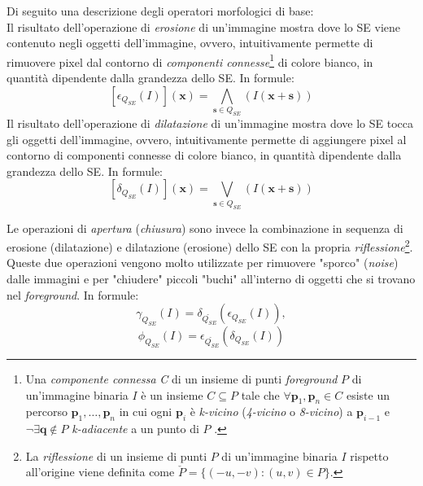 \par Di seguito una descrizione degli operatori morfologici di base:\\
Il risultato dell'operazione di \textit{erosione} di un'immagine mostra dove lo SE viene contenuto negli oggetti dell'immagine, ovvero, intuitivamente permette di rimuovere pixel dal contorno di \textit{componenti connesse}\footnote{Una \textit{componente connessa} \textit{C} di un insieme di punti \textit{foreground} $P$ di un'immagine binaria $I$ \`e un insieme $C\subseteq P$ tale che $\forall \textbf{p}_{1}, \textbf{p}_{n} \in C$ esiste un percorso $\textbf{p}_{1}, \dots, \textbf{p}_{n}$ in cui ogni $\textbf{p}_{i}$ \`e \textit{k-vicino} (\textit{4-vicino} o \textit{8-vicino}) a $\textbf{p}_{i-1}$ e $\neg \exists \textbf{q}\notin P$ \textit{k-adiacente} a un punto di $P$ \cite{bib:binary-images-connectivity}.} di colore bianco, in quantit\`a dipendente dalla grandezza dello SE. In formule:
\begin{equation}
	\label{eq:erosion}
	[\epsilon_{Q_{SE}}(I)](\textbf{x}) = \underset{\textbf{s}\in Q_{SE}}{\bigwedge}(I(\textbf{x}+\textbf{s}))
\end{equation}
Il risultato dell'operazione di \textit{dilatazione} di un'immagine mostra dove lo SE tocca gli oggetti dell'immagine, ovvero, intuitivamente permette di aggiungere pixel al contorno di componenti connesse di colore bianco, in quantit\`a dipendente dalla grandezza dello SE. In formule:
\begin{equation}
	\label{eq:dilation}
	[\delta_{Q_{SE}}(I)](\textbf{x}) = \underset{\textbf{s}\in Q_{SE}}{\bigvee}(I(\textbf{x}+\textbf{s}))
\end{equation}

Le operazioni di \textit{apertura} (\textit{chiusura}) sono invece la combinazione in sequenza di erosione (dilatazione) e dilatazione (erosione) dello SE con la propria \textit{riflessione}\footnote{La \textit{riflessione} di un insieme di punti $P$ di un'immagine binaria $I$ rispetto all'origine viene definita come $\check{P}=\{(-u,-v) \colon (u,v)\in P\}$.}. Queste due operazioni vengono molto utilizzate per rimuovere "sporco" (\textit{noise}) dalle immagini e per "chiudere" piccoli "buchi" all'interno di oggetti che si trovano nel \textit{foreground}. In formule:
\begin{equation}
	\label{eq:opening}
	\gamma_{Q_{SE}}(I) = \delta_{\check{Q_{SE}}}(\epsilon_{Q_{SE}}(I)),
\end{equation}
\begin{equation}
	\label{eq:closing}
	\phi_{Q_{SE}}(I) = \epsilon_{\check{Q_{SE}}}(\delta_{Q_{SE}}(I))
\end{equation}
\par

